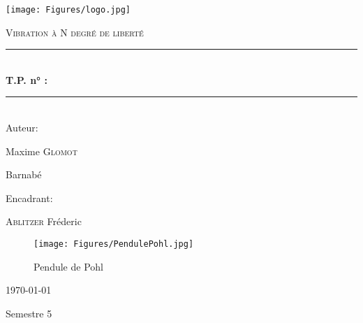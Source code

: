 \documentclass[10pt,a4paper, french]{article}
\newcommand{\HRule}{\rule{\linewidth}{0.5mm}}
\begin{document}
\begin{titlepage}
	\centering
	\texttt{[image: Figures/logo.jpg]}\par\vspace{1cm}

	\vspace{2cm}
	{\scshape\LARGE Vibration à N degré de liberté \par}
    \vspace{.5cm}
	\HRule \\[0.7cm]
	{\huge \bfseries T.P. n\si{\degree} : }\\[0.4cm]
	\HRule \\[1.5cm]
	\vspace{1.3cm}
	Auteur:\par
	{\large Maxime \textsc{Glomot}  \par
  \large Barnabé \textsc{}}
	\vspace{.4cm}

	Encadrant:\par
	{\large \textsc{Ablitzer} Fréderic} \\
	\vfill

	\begin{figure}[h]
        \centering
        \texttt{[image: Figures/PendulePohl.jpg]}
        \caption{Pendule de Pohl}
        \end{figure}
	{\large \today \par}
    Semestre 5 \\
\end{titlepage}

\newpage
\begin{center}
\renewcommand{\contentsname}{Sommaire}
\tableofcontents
\end{center}
\renewcommand*\listfigurename{Liste des Figures}
\listoffigures
\end{document}
